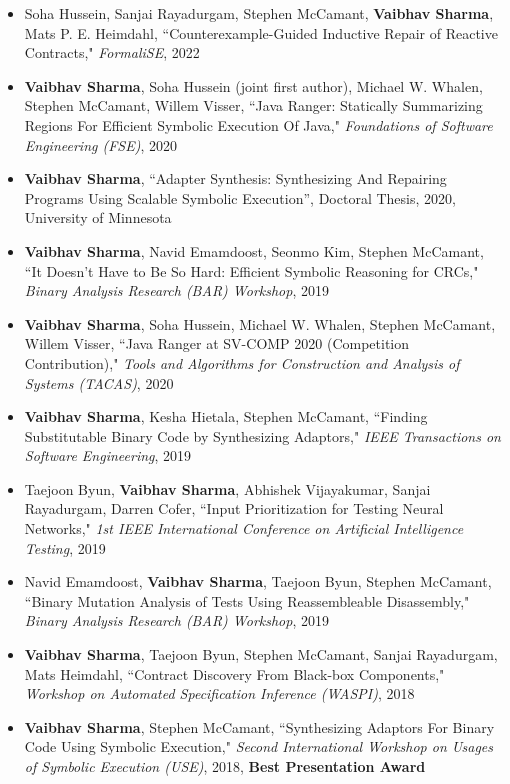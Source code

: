 \documentclass[letterpaper,10pt]{article}
\newlength{\outerbordwidth}
\newcommand{\resheading}[1]{\vspace{-8pt}
  \parbox{\textwidth}{\setlength{\FrameSep}{\outerbordwidth}
    \begin{shaded}
\setlength{\fboxsep}{0pt}\framebox[\textwidth][l]{\setlength{\fboxsep}{4pt}\fcolorbox{shadecolorB}{shadecolorB}{\textbf{\sffamily{\mbox{~}\makebox[6.762in][l]{\large #1} \vphantom{p\^{E}}}}}}
    \end{shaded}
  }\vspace{-5pt}
}
\begin{document}
%
\resheading{Publications}
\vspace{-8pt}
\begin{itemize}
\item
  Soha Hussein, Sanjai Rayadurgam, Stephen McCamant, {\bf Vaibhav Sharma}, Mats P. E. Heimdahl, ``Counterexample-Guided Inductive Repair of Reactive Contracts," \textit{FormaliSE}, 2022
  \item
{\bf Vaibhav Sharma}, Soha Hussein (joint first author), Michael W. Whalen, Stephen McCamant, Willem Visser, ``Java Ranger: Statically Summarizing Regions For Efficient Symbolic Execution Of Java," \textit{Foundations of Software Engineering (FSE)}, 2020
\item
{\bf Vaibhav Sharma}, ``Adapter Synthesis: Synthesizing And Repairing Programs Using Scalable Symbolic Execution'', Doctoral Thesis, 2020, University of Minnesota
\item
{\bf Vaibhav Sharma}, Navid Emamdoost, Seonmo Kim, Stephen McCamant, ``It Doesn't Have to Be So Hard: Efficient Symbolic Reasoning for CRCs," \textit{Binary Analysis Research (BAR) Workshop}, 2019
\item
{\bf Vaibhav Sharma}, Soha Hussein, Michael W. Whalen, Stephen McCamant, Willem Visser, ``Java Ranger at SV-COMP 2020 (Competition Contribution)," \textit{Tools and Algorithms for Construction and Analysis of Systems (TACAS)}, 2020
\item
{\bf Vaibhav Sharma}, Kesha Hietala, Stephen McCamant, ``Finding Substitutable Binary Code by Synthesizing Adaptors," \textit{IEEE Transactions on Software Engineering}, 2019
\item
Taejoon Byun, {\bf Vaibhav Sharma}, Abhishek Vijayakumar, Sanjai Rayadurgam, Darren Cofer, ``Input Prioritization for Testing Neural Networks," \textit{1st IEEE International Conference on Artificial Intelligence Testing}, 2019
\item
Navid Emamdoost, {\bf Vaibhav Sharma}, Taejoon Byun, Stephen McCamant, ``Binary Mutation Analysis of Tests Using Reassembleable Disassembly," \textit{Binary Analysis Research (BAR) Workshop}, 2019
\item
{\bf Vaibhav Sharma}, Taejoon Byun, Stephen McCamant, Sanjai Rayadurgam, Mats Heimdahl, ``Contract Discovery From Black-box Components," \textit{Workshop on Automated Specification Inference (WASPI)}, 2018
\item
{\bf Vaibhav Sharma}, Stephen McCamant, ``Synthesizing Adaptors For Binary Code Using Symbolic Execution," \textit{Second International Workshop on Usages of Symbolic Execution (USE)}, 2018, {\bf Best Presentation Award}

\end{itemize}
\end{document}
